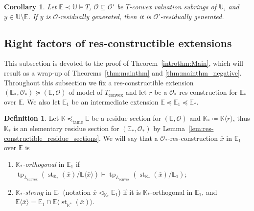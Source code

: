\documentclass{amsart}
\newtheorem{corollary}[theorem]{Corollary}
\theoremstyle{remark}
\theoremstyle{definition}
\newtheorem{definition}[theorem]{Definition}
\theoremstyle{plain}
\newcommand{\bE}{\mathbb E}
\newcommand{\bK}{\mathbb K}
\newcommand{\bU}{\mathbb U}
\newcommand{\cO}{\mathcal O}
\newcommand{\convex}{\mathrm{convex}}
\newcommand{\tame}{\mathrm{tame}}
\DeclareMathOperator{\std}{\mathrm{st}}
\DeclareMathOperator{\tp}{\mathrm{tp}}
\theoremstyle{plain}
\begin{document}
\begin{corollary}\label{cor:res-gen_for_different_vals}
    Let $\bE \prec \bU \models T$, $\cO \subseteq \cO'$ be $T$-convex valuation subrings of $\bU$, and $y \in \bU \setminus \bE$. If $y$ is $\cO$-residually generated, then it is $\cO'$-residually generated.
\end{corollary}


\subsection{Right factors of res-constructible extensions} This subsection is devoted to the proof of Theorem~\ref{introthm:Main}, which will result as a wrap-up of Theorems~\ref{thm:mainthm} and \ref{thm:mainthm_negative}. Throughout this subsection we fix a res-constructible extension $(\bE_*, \cO_*) \succeq (\bE, \cO)$ of model of $T_\convex$ and let $\overline{r}$ be a $\cO_*$-res-construction for $\bE_*$ over $\bE$. We also let $\bE_1$ be an intermediate extension $\bE \preceq \bE_1 \preceq \bE_*$.

\begin{definition}\label{def:strong}
    Let $\bK\preceq_\tame \bE$ be a residue section for $(\bE, \cO)$ and $\bK_* \coloneqq  \bK \langle \overline{r} \rangle$, thus $\bK_*$ is an elementary residue section for $(\bE_*, \cO_*)$ by Lemma~\ref{lem:res-constructible_residue_sections}.
    We will say that a $\cO_*$-res-construction $\overline{x}$ in $\bE_1$ over $\bE$ is
    \begin{enumerate}
        \item \emph{$\bK_*$-orthogonal} in $\bE_1$ if $\tp_{L_\convex}(\std_{\bK_*}(\overline{x}) /\bE\langle \overline{x}\rangle) \vdash \tp_{L_\convex}(\std_{\bK_*}(\overline{x}) /\bE_1)$;
        \item \emph{$\bK_*$-strong} in $\bE_1$ (notation $\overline{x} \triangleleft_{\bK_*} \bE_1$) if it is $\bK_*$-orthogonal in $\bE_1$, and $\bE \langle \overline{x}\rangle = \bE_1 \cap \bE \langle \std_{\bK^*}(\overline{x})\rangle$.
    \end{enumerate}
\end{definition}
\end{document}
